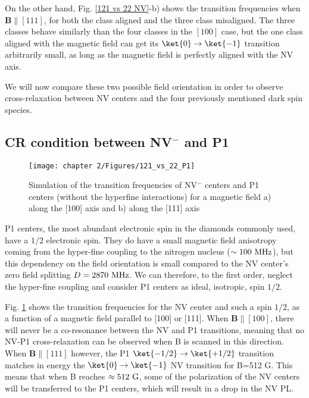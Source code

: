 \documentclass[a4paper, 11pt]{report}
\begin{document}
On the other hand, Fig. \ref{121 vs 22 NV}-b) shows the transition frequencies when $\mathbf{B} \parallel [111]$, for both the class aligned and the three class misaligned. The three classes behave similarly than the four classes in the $[100]$ case, but the one class aligned with the magnetic field can get its $\ket{0}\to\ket{-1}$ transition arbitrarily small, as long as the magnetic field is perfectly aligned with the NV axis.

We will now compare these two possible field orientation in order to observe cross-relaxation between NV centers and the four previously mentioned dark spin species.

\subsection{CR condition between NV$^-$ and P1}

\begin{figure}[h]
\centering
\texttt{[image: chapter 2/Figures/121\_vs\_22\_P1]}
\caption{Simulation of the transition frequencies of NV$^-$ centers and P1 centers (without the hyperfine interactions) for a magnetic field a) along the [100] axis and b) along the [111] axis}
\label{121 vs 22 P1}
\end{figure}

P1 centers, the most abundant electronic spin in the diamonds commonly used, have a $1/2$ electronic spin. They do have a small magnetic field anisotropy coming from the hyper-fine coupling to the nitrogen nucleus ($\sim 100\ \rm MHz$), but this dependency on the field orientation is small compared to the NV center's zero field splitting $D=2870\ \rm MHz$. We can therefore, to the first order, neglect the hyper-fine coupling and consider P1 centers as ideal, isotropic, spin $1/2$.

Fig. \ref{121 vs 22 P1} shows the transition frequencies for the NV center and such a spin $1/2$, as a function of a magnetic field parallel to [100] or [111]. When $\mathbf{B} \parallel [100]$, there will never be a co-resonance between the NV and P1 transitions, meaning that no NV-P1 cross-relaxation can be observed when B is scanned in this direction. When $\mathbf{B} \parallel [111]$ however, the P1 $\ket{-1/2} \to \ket{+1/2}$ transition matches in energy the $\ket{0}\to\ket{-1}$ NV transition for B=512 G. This means that when B reaches $\approx 512\ \rm G$, some of the polarization of the NV centers will be transferred to the P1 centers, which will result in a drop in the NV PL. 
\end{document}
